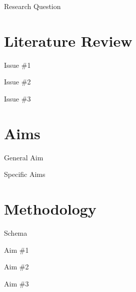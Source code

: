 \documentclass[aspectratio=169]{beamer}
\begin{document}
\begin{frame}{Research Question}
    
\end{frame}


\section{Literature Review}


\begin{frame}{Issue \#1}
    
\end{frame}


\begin{frame}{Issue \#2}
    
\end{frame}


\begin{frame}{Issue \#3}
    
\end{frame}


\section{Aims}

\begin{frame}{General Aim}
    
\end{frame}

\begin{frame}{Specific Aims}
    
\end{frame}


\section{Methodology}

\begin{frame}{Schema}
    
\end{frame}


\begin{frame}{Aim \#1}
    
\end{frame}


\begin{frame}{Aim \#2}
    
\end{frame}


\begin{frame}{Aim \#3}
    
\end{frame}
\end{document}
